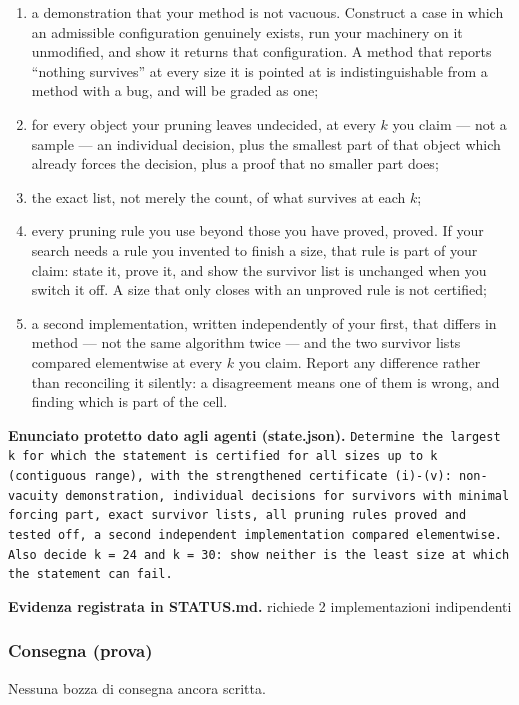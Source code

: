 \documentclass[11pt,a4paper]{article}
\begin{document}
\begin{enumerate}
\def\labelenumi{(\roman{enumi})}
\item
  a demonstration that your method is not vacuous. Construct a case in
  which an admissible configuration genuinely exists, run your machinery
  on it unmodified, and show it returns that configuration. A method
  that reports ``nothing survives'' at every size it is pointed at is
  indistinguishable from a method with a bug, and will be graded as one;
\item
  for every object your pruning leaves undecided, at every \(k\) you
  claim --- not a sample --- an individual decision, plus the smallest
  part of that object which already forces the decision, plus a proof
  that no smaller part does;
\item
  the exact list, not merely the count, of what survives at each \(k\);
\item
  every pruning rule you use beyond those you have proved, proved. If
  your search needs a rule you invented to finish a size, that rule is
  part of your claim: state it, prove it, and show the survivor list is
  unchanged when you switch it off. A size that only closes with an
  unproved rule is not certified;
\item
  a second implementation, written independently of your first, that
  differs in method --- not the same algorithm twice --- and the two
  survivor lists compared elementwise at every \(k\) you claim. Report
  any difference rather than reconciling it silently: a disagreement
  means one of them is wrong, and finding which is part of the cell.
\end{enumerate}

\textbf{Enunciato protetto dato agli agenti (state.json).} \texttt{Determine the largest k for which the statement is certified for all sizes up to k (contiguous range), with the strengthened certificate (i)-(v): non-vacuity demonstration, individual decisions for survivors with minimal forcing part, exact survivor lists, all pruning rules proved and tested off, a second independent implementation compared elementwise. Also decide k = 24 and k = 30: show neither is the least size at which the statement can fail.}

\textbf{Evidenza registrata in STATUS.md.} richiede 2 implementazioni indipendenti

\subsubsection{Consegna (prova)}
Nessuna bozza di consegna ancora scritta.
\end{document}

